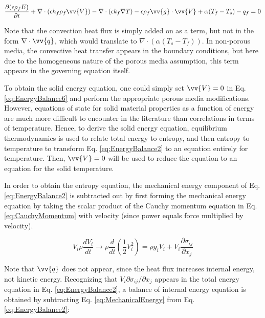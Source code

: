 \documentclass[10pt]{article}
\numberwithin{equation}{section} %
\begin{document}
\begin{equation}
\label{eq:EnergyBalance7}
\begin{aligned}
\frac{\partial (\epsilon\rho_f E)}{\partial t}+\nabla\cdot(\epsilon h_f\rho_f\vv{V})-\nabla\cdot(\epsilon k_f\nabla T)-\epsilon\rho_f \vv{g}\cdot\vv{V}+\alpha(T_f-T_s)-q_f=0\\
\end{aligned}
\end{equation}

Note that the convection heat flux is simply added on as a term, but not in the form \(\nabla\cdot\vv{q}\), which would translate to \(\nabla\cdot(\alpha(T_s-T_f))\). In non-porous media, the convective heat transfer appears in the boundary conditions, but here due to the homogeneous nature of the porous media assumption, this term appears in the governing equation itself.

To obtain the solid energy equation, one could simply set \(\vv{V}=0\) in Eq. \eqref{eq:EnergyBalance6} and perform the appropriate porous media modifications. However, equations of state for solid material properties as a function of energy are much more difficult to encounter in the literature than correlations in terms of temperature. Hence, to derive the solid energy equation, equilibrium thermodynamics is used to relate total energy to entropy, and then entropy to temperature to transform Eq. \eqref{eq:EnergyBalance2} to an equation entirely for temperature. Then, \(\vv{V}=0\) will be used to reduce the equation to an equation for the solid temperature.

In order to obtain the entropy equation, the mechanical energy component of Eq. \eqref{eq:EnergyBalance2} is subtracted out by first forming the mechanical energy equation by taking the scalar product of the Cauchy momentum equation in Eq. \eqref{eq:CauchyMomentum} with velocity (since power equals force multiplied by velocity).

\begin{equation}
\label{eq:MechanicalEnergy}
V_i\rho\frac{dV_i}{dt}\rightarrow\rho\frac{d}{dt}\left(\frac{1}{2}V_i^2\right)=\rho g_iV_i+V_i\frac{\partial\sigma_{ij}}{\partial x_j}
\end{equation}

Note that \(\vv{q}\) does not appear, since the heat flux increases internal energy, not kinetic energy. Recognizing that \(V_i\partial\sigma_{ij}/\partial x_j\) appears in the total energy equation in Eq. \eqref{eq:EnergyBalance2}, a balance of internal energy equation is obtained by subtracting Eq. \eqref{eq:MechanicalEnergy} from Eq. \eqref{eq:EnergyBalance2}:
\end{document}
